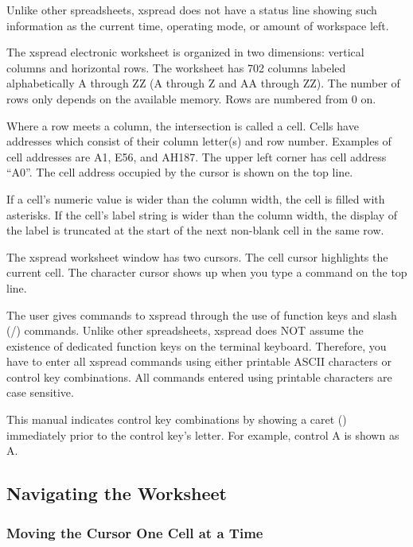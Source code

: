     Unlike other spreadsheets, xspread does not have a status line showing 
such information as the current time, operating mode, or amount of workspace 
left.

    The xspread electronic worksheet is organized in two dimensions:  vertical 
columns and horizontal rows.  The worksheet has 702 columns labeled
alphabetically A through ZZ (A through Z and AA through ZZ).  The number
of rows only depends on the available memory. Rows are numbered from 0 on.

    Where a row meets a column, the intersection is called a cell.  Cells have 
addresses which consist of their column letter(s) and row number.  Examples of 
cell addresses are A1, E56, and AH187.  The upper left corner has cell address 
``A0''.  The cell address occupied by the cursor is shown on the top line.

    If a cell's numeric value is wider than the column width, the cell is 
filled with asterisks.  If the cell's label string is wider than the column 
width, the display of the label is truncated at the start of the next 
non-blank cell in the same row.

    The xspread worksheet window has two cursors.  The cell cursor highlights 
the current cell.
The character cursor shows up when you type a command on the 
top line.

    The user gives commands to xspread through the use of function keys and 
slash (/) commands.  Unlike other spreadsheets, xspread does NOT assume the 
existence of dedicated function keys on the terminal keyboard.  Therefore, you 
have to enter all xspread commands using either printable ASCII characters or 
control key combinations.  All commands entered using printable characters are 
case sensitive.

    This manual indicates control key combinations by showing a caret (\ctrl ) 
immediately prior to the control key's letter.  For example, control A is 
shown as \ctrl A.

\subsection*{Navigating the Worksheet}

\subsubsection*{Moving the Cursor One Cell at a Time}


